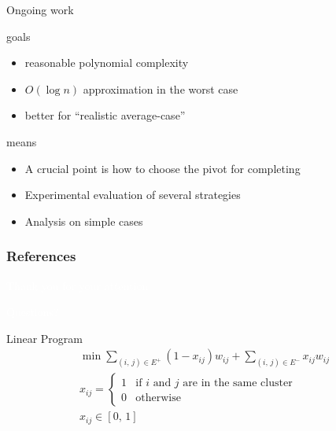 \documentclass[final,xcolor=svgnames,A4]{beamer}
\begin{document}
\begin{frame}[t]{Ongoing work}
	\begin{block}{goals}
		\begin{itemize}
				\item reasonable polynomial complexity
				\item $O(\log n)$ approximation in the worst case
				\item better for \enquote{realistic average-case}
					\autocite{Makarychev2014}
		\end{itemize}
	\end{block}
	\begin{block}{means}
	\begin{itemize}
		\item A crucial point is how to choose the pivot for completing
		\item Experimental evaluation of several strategies
		\item Analysis on simple cases
	\end{itemize}
	\end{block}
\end{frame}

\appendix
\begin{frame}[t,allowframebreaks]
	\frametitle{References}
	\printbibliography
\end{frame}



\begin{frame}

\begin{center} 
\textcolor{white} {\huge Thank you for your attention}
\end{center}
\begin{center} 
\textcolor{white} {\Large Questions?}
\end{center} 
\end{frame}

\begin{frame}[t]{Linear Program}
	\begin{align*}
		\min \sum_{(i,\, j)\in E^+} (1-x_{ij}) w_{ij} +
		\sum_{(i,\, j)\in E^-} x_{ij} w_{ij} \\
		x_{ij} =   \begin{cases}
			1 & \text{if $i$ and $j$ are in the same cluster} \\
			0       & \text{otherwise}
		\end{cases} \\
		x_{ij} \in [0,\,1]
	\end{align*}
\end{frame}
\end{document}
